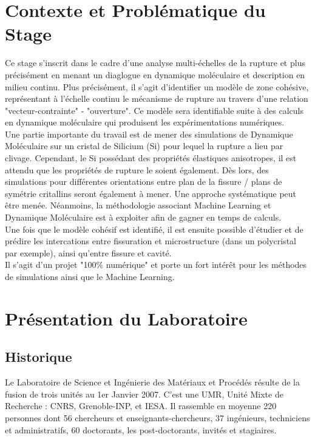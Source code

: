 \section{Contexte et Problématique du Stage} %

    Ce stage s'inscrit dans le cadre d'une analyse multi-échelles de la rupture et plus précisément en menant un diaglogue en dynamique moléculaire et description en milieu continu. Plus précisément, il s'agit d'identifier un modèle de zone cohésive, représentant à l'échelle continu le mécanisme de rupture au travers d'une relation "vecteur-contrainte" - "ouverture". Ce modèle sera identifiable suite à des calculs en dynamique moléculaire qui produisent les expérimentations numériques. \\

    Une partie importante du travail est de mener des simulations de Dynamique Moléculaire sur un cristal de Silicium (Si) pour lequel la rupture a lieu par clivage. Cependant, le Si possédant des propriétés élastiques anisotropes, il est attendu que les propriétés de rupture le soient également. Dès lors, des simulations pour différentes orientations entre plan de la fissure / plans de symétrie critallins seront également à mener. Une approche systématique peut être menée. Néanmoins, la méthodologie associant Machine Learning et Dynamique Moléculaire est à exploiter afin de gagner en temps de calculs. \\
    
    Une fois que le modèle cohésif est identifié, il est ensuite possible d'étudier et de prédire les intercations entre fissuration et microstructure (dans un polycristal par exemple), ainsi qu'entre fissure et cavité. \\

    Il s'agit d'un projet "100\% numérique" et porte un fort intérêt pour les méthodes de simulations ainsi que le Machine Learning.

\section{Présentation du Laboratoire}

    \subsection{Historique}

        Le Laboratoire de Science et Ingénierie des Matériaux et Procédés résulte de la fusion de trois unités au 1er Janvier 2007. C'est une UMR, Unité Mixte de Recherche : CNRS, Grenoble-INP, et IESA. Il rassemble en moyenne 220 personnes dont 56 chercheurs et enseignants-chercheurs, 37 ingénieurs, techniciens et administratifs, 60 doctorants, les post-doctorants, invités et stagiaires. 

